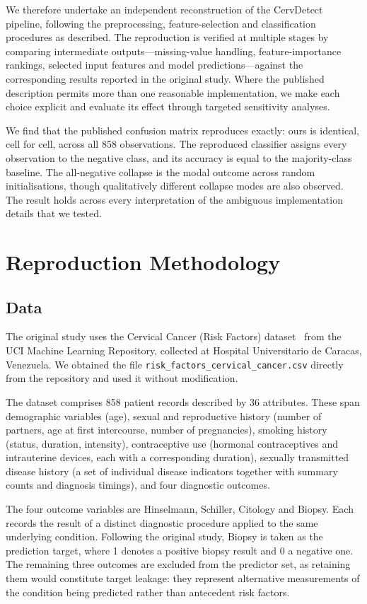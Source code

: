 We therefore undertake an independent reconstruction of the CervDetect
pipeline, following the preprocessing, feature-selection and classification
procedures as described. The reproduction is verified at multiple stages by
comparing intermediate outputs---missing-value handling, feature-importance
rankings, selected input features and model predictions---against the
corresponding results reported in the original study. Where the published
description permits more than one reasonable implementation, we make each
choice explicit and evaluate its effect through targeted sensitivity analyses.

We find that the published confusion matrix reproduces exactly: ours is
identical, cell for cell, across all 858 observations. The reproduced
classifier assigns every observation to the negative class, and its accuracy is
equal to the majority-class baseline. The all-negative collapse is the modal outcome across random initialisations,
though qualitatively different collapse modes are also observed. The result
holds across every interpretation of the ambiguous implementation details that
we tested.

\section{Reproduction Methodology}\label{sec:methods}

\subsection{Data}\label{sec:data}

The original study uses the Cervical Cancer (Risk Factors)
dataset~\cite{fernandes2017} from the UCI Machine Learning Repository,
collected at Hospital Universitario de Caracas, Venezuela. We obtained the file
\texttt{risk\_factors\_cervical\_cancer.csv} directly from the repository and
used it without modification.

The dataset comprises 858 patient records described by 36 attributes. These
span demographic variables (age), sexual and reproductive history (number of
partners, age at first intercourse, number of pregnancies), smoking history
(status, duration, intensity), contraceptive use (hormonal contraceptives and
intrauterine devices, each with a corresponding duration), sexually transmitted
disease history (a set of individual disease indicators together with summary
counts and diagnosis timings), and four diagnostic outcomes.

The four outcome variables are Hinselmann, Schiller, Citology and Biopsy. Each
records the result of a distinct diagnostic procedure applied to the same
underlying condition. Following the original study, Biopsy is taken as the
prediction target, where 1 denotes a positive biopsy result and 0 a negative
one. The remaining three outcomes are excluded from the predictor set, as
retaining them would constitute target leakage: they represent alternative
measurements of the condition being predicted rather than antecedent risk
factors.

